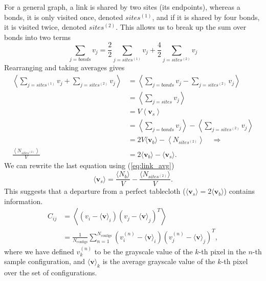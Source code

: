 \documentclass[../main.tex]{subfiles}
\begin{document}
%
For a general graph, a link is shared by two sites (its endpoints), whereas a
%
bonds, it is only visited once, denoted $sites^{(1)}$, and if it is shared by
four bonds, it is visited twice, denoted $sites^{(2)}$. This allows us to break
up the sum over bonds into two terms
%
\begin{equation}
    \sum_{j=bonds} v_j = \frac{2}{2}\sum_{j=sites^{(1)}} v_j
        + \frac{4}{2} \sum_{j=sites^{(2)}} v_j
\end{equation}
%
Rearranging and taking averages gives
%
\begin{align}
    \left\langle \sum_{j=sites^{(1)}} v_j \right. 
    + \left. \sum_{j=sites^{(2)}} v_j \right\rangle
    &=\left\langle \sum_{j=bonds} v_j - \sum_{j=sites^{(2)}} v_j \right\rangle\\
    &= \left\langle \sum_{j=sites} v_j\right\rangle\\
    &= V\left\langle \mathbf{v}_s\right\rangle\\
    & = \left\langle \sum_{j=bonds} v_j \right\rangle - \left\langle
        \sum_{j=sites^{(2)}} v_j \right\rangle\\
    &= 2V \langle\mathbf{v}_b\rangle - \left\langle
        N_{sites^{(2)}}\right\rangle\quad\Longrightarrow\\
    \frac{\left\langle N_{sites^{(2)}}\right\rangle}{V} &=
        2\langle\mathbf{v}_b\rangle - \langle \mathbf{v}_s\rangle.
\end{align}
%
We can rewrite the last equation using (\ref{eq:link_avg})
%
\begin{equation}
    \langle \mathbf{v}_s \rangle= \frac{\langle N_b\rangle}{V} - \frac{\langle
        N_{sites^{(2)}}\rangle}{V}.
\end{equation}
%
This suggests that a departure from a perfect tablecloth ($\langle
\mathbf{v}_s\rangle = 2\langle \mathbf{v}_b\rangle$) contains information.
%
%
%
%
\begin{align}
    C_{ij} &=
    \left\langle\left(v_i -\langle \mathbf{v}\rangle_i\right)
    {\left(v_j -\langle \mathbf{v}\rangle_j\right)}^{T}\right\rangle\\
        &= \frac{1}{N_{\mathrm{configs}}}\sum_{n=1}^{N_{\mathrm{configs}}}
        {\left(v_i^{(n)} -\langle \mathbf{v}\rangle_i\right)}
        {\left(v_j^{(n)} -\langle \mathbf{v}\rangle_j\right)}^{T},
\label{covariance_matrix}
\end{align}
%
where we have defined $v_k^{(n)}$ to be the grayscale value of the $k$-th pixel
in the $n$-th sample configuration, and $\langle \mathbf{v}\rangle_k$ is the
average grayscale value of the $k$-th pixel over the set of configurations.
\end{document}
